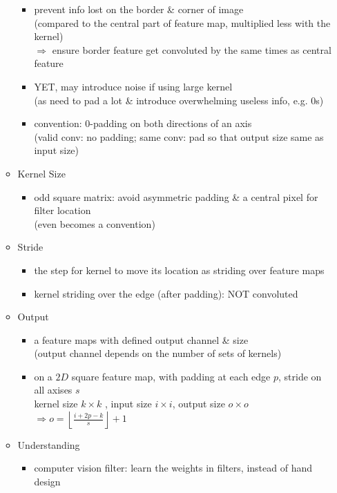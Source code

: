 \begin{itemize}
\begin{itemize}
\begin{itemize}
		\item prevent info lost on the border \& corner of image \\
		(compared to the central part of feature map, multiplied less with the kernel) \\
		$\Rightarrow$ ensure border feature get convoluted by the same times as central feature
		\item YET, may introduce noise if using large kernel \\
		(as need to pad a lot \& introduce overwhelming useless info, e.g. $0$s)
		\item convention: $0$-padding on both directions of an axis \\
		(valid conv: no padding; same conv: pad so that output size same as input size)
		\end{itemize}
	\item Kernel Size
		\begin{itemize}
		\item odd square matrix: avoid asymmetric padding \& a central pixel for filter location \\
		(even becomes a convention)
		\end{itemize}
	\item Stride
		\begin{itemize}
		\item the step for kernel to move its location as striding over feature maps
		\item kernel striding over the edge (after padding): NOT convoluted
		\end{itemize}
	\item Output
		\begin{itemize}
		\item a feature maps with defined output channel \& size \\
		(output channel depends on the number of sets of kernels)
		\item on a $2D$ square feature map, with padding at each edge $p$, stride on all axises $s$ \\ 
		kernel size $k\times k$ , input size $i\times i$, output size $o\times o$ \\
		$\displaystyle \Rightarrow o = \left\lfloor\frac {i+2p-k} {s} \right\rfloor + 1$
		\end{itemize}
	\item Understanding
		\begin{itemize}
		\item computer vision filter: learn the weights in filters, instead of hand design \\ 

\end{itemize}
\end{itemize}
\end{itemize}
